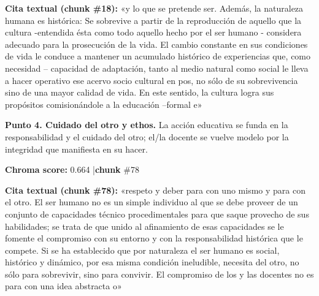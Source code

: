 \documentclass[11pt]{article}
\newcommand{\score}[2]{{\small\textbf{Chroma score:} #1 \quad|\quad \textbf{chunk} \##2}}
\begin{document}
\begin{mdframed}[backgroundcolor=qbg,linecolor=qrule,linewidth=1pt,leftline=true,topline=false,bottomline=false,rightline=false,innerleftmargin=8pt,innertopmargin=6pt,innerbottommargin=6pt]
{\small\textbf{Cita textual (chunk \#18):} «y lo que se pretende ser. Además, la naturaleza humana es histórica: Se sobrevive a partir de la reproducción de aquello que la cultura -entendida ésta como todo aquello hecho por el ser humano - considera adecuado para la prosecución de la vida. El cambio constante en sus condiciones de vida le conduce a mantener un acumulado histórico de experiencias que, como necesidad -- capacidad de adaptación, tanto al medio natural como social le lleva a hacer operativo ese acervo socio cultural en pos, no sólo de su sobrevivencia sino de una mayor calidad de vida. En este sentido, la cultura logra sus propósitos comisionándole a la educación --formal e»}
\end{mdframed}
\par
\vspace{0.9em}
\noindent\textbf{Punto 4. Cuidado del otro y ethos.} La acci\'on educativa se funda en la responsabilidad y el cuidado del otro; el/la docente se vuelve modelo por la integridad que manifiesta en su hacer.\par
\score{0.664}{78}\par\smallskip
{}\par\smallskip
\begin{mdframed}[backgroundcolor=qbg,linecolor=qrule,linewidth=1pt,leftline=true,topline=false,bottomline=false,rightline=false,innerleftmargin=8pt,innertopmargin=6pt,innerbottommargin=6pt]
{\small\textbf{Cita textual (chunk \#78):} «respeto y deber para con uno mismo y para con el otro. El ser humano no es un simple individuo al que se debe proveer de un conjunto de capacidades técnico procedimentales para que saque provecho de sus habilidades; se trata de que unido al afinamiento de esas capacidades se le fomente el compromiso con su entorno y con la responsabilidad histórica que le compete. Si se ha establecido que por naturaleza el ser humano es social, histórico y dinámico, por esa misma condición ineludible, necesita del otro, no sólo para sobrevivir, sino para convivir. El compromiso de los y las docentes no es para con una idea abstracta o»}
\end{mdframed}
\end{document}
